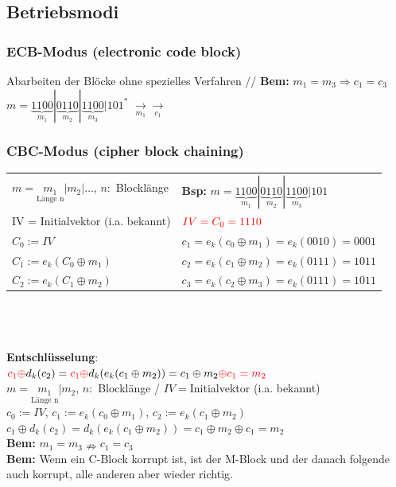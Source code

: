 \documentclass[landscape,twocolumn,a4paper]{article}
\newcommand{\Bold}[1]{\textbf{#1}} %
\newcommand{\T}[1]{\text{#1}} %
\newcommand{\Ra}{\Rightarrow}
\newcommand{\Unten}[2]{\underset{#1}{#2}} %
\begin{document}
\subsection{Betriebsmodi}
\subsubsection{ECB-Modus (electronic code block)}
Abarbeiten der Blöcke ohne spezielles Verfahren {\color{gray} // \Bold{Bem:} $m_1=m_3\Ra c_1=c_3$} \\
 $m=\underbrace{1100}_{m_1}|\underbrace{0110}_{m_2}|\underbrace{1100}_{m_3}|101^*$ $\Unten{m_1}{\longrightarrow}$$\Unten{c_1}{\longrightarrow}$ 
\subsubsection{CBC-Modus (cipher block chaining)}
\begin{tabular}{p{7.5cm}  l}
	$m=\Unten{\T{Länge n}}{m_1}|m_2|\dots$, $n:$ Blocklänge &\Bold{Bsp:} $m=\underbrace{1100}_{m_1} | \underbrace{0110}_{m_2} | \underbrace{1100}_{m_3} | 101$ \\
	{\color{red}IV = Initialvektor} (i.a. bekannt) &  $\color{red}IV=C_0=1110$  \\
	$C_0 := IV$ & $c_1 = e_k(c_0 \oplus m_1) = e_k(0010) = 0001$ \\
	$C_1 := e_k(C_0 \oplus m_1)$ & $c_2 = e_k(c_1 \oplus m_2) = e_k(0111) = 1011$ \\
	$C_2 := e_k(C_1 \oplus m_2)$  & $c_3 = e_k(c_2 \oplus m_3) = e_k(0111) = 1011$ \\
\end{tabular} \\ \\ \\
 \textbf{Entschlüsselung}:  \\
 ${\color{red}c_1\oplus} d_k(c_2)={\color{red}c_1\oplus}d_k(e_k(c_1\oplus m_2))= c_1\oplus m_2 {\color{red}\oplus c_1 = m_2}$ \\
 $m=\Unten{\T{Länge n}}{m_1}|m_2$, $n:$ Blocklänge / $IV=$Initialvektor (i.a. bekannt)\\
 $c_0:=IV$, $c_1:=e_k(c_0\oplus m_1)$, $c_2:=e_k(c_1\oplus m_2)$\\
 $c_1\oplus d_k(c_2)=d_k(e_k(c_1\oplus m_2))=c_1\oplus m_2\oplus c_1=m_2$ \\
 \Bold{Bem:} $m_1=m_3\nRightarrow c_1=c_3$ \\
 \Bold{Bem:} Wenn ein C-Block korrupt ist, ist der M-Block und der danach folgende auch korrupt, alle anderen aber wieder richtig.
 
\end{document}
